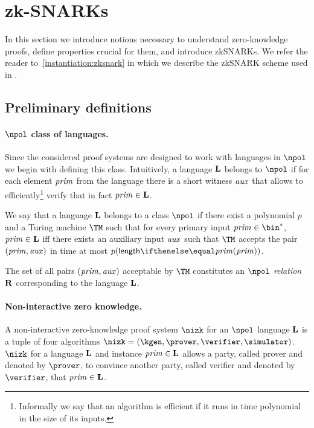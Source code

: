 
\section{zk-SNARKs}\label{preliminaries:zk-snark}

In this section we introduce notions necessary to understand zero-knowledge proofs, define properties crucial for them, and introduce zkSNARKs.
We refer the reader to~\cref{instantiation:zksnark} in which we describe the zkSNARK scheme used in \zeth{}.

\subsection{Preliminary definitions}

\paragraph{$\npol$ class of languages.}
Since the considered proof systems are designed to work with languages in $\npol$ we begin with defining this class. Intuitively, a language $\mathbf{L}$ belongs to $\npol$ if for each element $\mathit{prim}$ from the language there is a short witness $\mathit{aux}$ that allows to efficiently\footnote{Informally we say that an algorithm is efficient if it runs in time polynomial in the size of its inputs.} verify that in fact $\mathit{prim} \in \mathbf{L}$.

\begin{definition}
  We say that a language $\mathbf{L}$ belongs to a class $\npol$ if there exist a polynomial $p$ and a Turing machine $\TM$ such that for every primary input $\priminputs \in \bin^{*}$, $\mathit{prim} \in \mathbf{L}$ iff there exists an auxiliary input $\mathit{aux}$ such that $\TM$ accepts the pair $(\mathit{prim}, \mathit{aux})$ in time at most $p(\len {\priminputs})$.

  The set of all pairs $(\mathit{prim}, \mathit{aux})$ acceptable by $\TM$ constitutes an \emph{$\npol$ relation} $\mathbf{R}$ corresponding to the language $\mathbf{L}$.
\end{definition}

\paragraph{Non-interactive zero knowledge.}
A non-interactive zero-knowledge proof system $\nizk$ for an $\npol$ language $\mathbf{L}$ is a tuple of four algorithms $\nizk = (\kgen, \prover, \verifier, \simulator)$. $\nizk$ for a language $\mathbf{L}$ and instance $\mathit{prim} \in \mathbf{L}$ allows a party, called prover and denoted by $\prover$, to convince another party, called verifier and denoted by $\verifier$, that $\mathit{prim} \in \mathbf{L}$.

